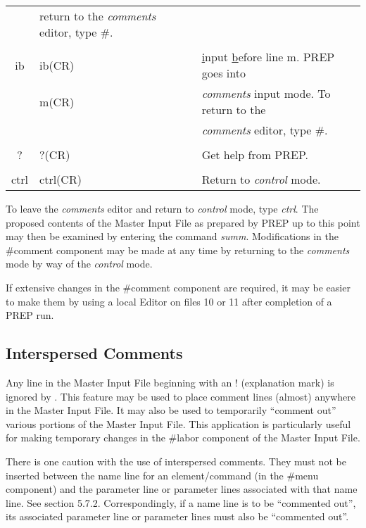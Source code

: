 \begin{table}
\begin{center}
\begin{tabular}{|c|l|l|}
& return to the {\em comments} editor, type \#. \\ & & \\ ib & ib(CR) &
{\underline i}nput {\underline b}efore line m. PREP goes into\\ & m(CR) &
{\em comments} input mode. To return to the \\ & & {\em comments} editor,
type \#. \\ & & \\ ? & ?(CR) & Get help from PREP. \\ & & \\ ctrl &
ctrl(CR) & Return to {\em control} mode. \\ \hline
\end{tabular}
\end{center}
\end{table}

To leave the {\em comments} editor and return to {\em control} mode, type
{\em ctrl}. The proposed contents of the Master Input File as prepared by
PREP up to this point may then be examined by entering the command {\em
summ}. Modifications in the \#comment component may be made at any time by
returning to the {\em comments} mode by way of the {\em control} mode.

If extensive changes in the \#comment component are required, it may be
easier to make them by using a local Editor on files 10 or 11 after
completion of a PREP run.

\subsection{Interspersed Comments} Any line in the \Mary Master Input File
beginning with an ! (explanation mark) is ignored by \Maryend. This feature
may be used to place comment lines (almost) anywhere in the Master Input
File. It may also be used to temporarily ``comment out'' various portions
of the Master Input File. This application is particularly useful for
making temporary changes in the \#labor component of the Master Input
File.

There is one caution with the use of interspersed comments. They must not
be inserted between the name line for an element/command (in the \#menu
component) and the parameter line or parameter lines associated with that
name line. See section 5.7.2. Correspondingly, if a name line is to be
``commented out'', its associated parameter line or parameter lines must
also be ``commented out''.

